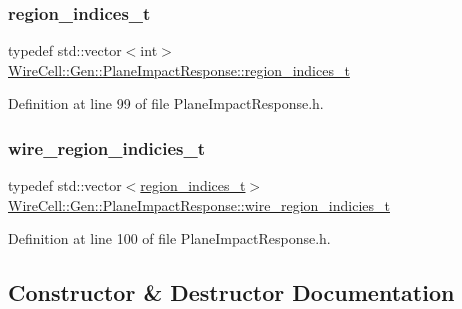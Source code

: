 \subsubsection{\texorpdfstring{region\+\_\+indices\+\_\+t}{region\_indices\_t}}
{\footnotesize\ttfamily typedef std\+::vector$<$int$>$ \hyperlink{class_wire_cell_1_1_gen_1_1_plane_impact_response_a76147eaef10e6fe542bf25d85acc40f7}{Wire\+Cell\+::\+Gen\+::\+Plane\+Impact\+Response\+::region\+\_\+indices\+\_\+t}}



Definition at line 99 of file Plane\+Impact\+Response.\+h.

\mbox{\label{class_wire_cell_1_1_gen_1_1_plane_impact_response_a383b0ed60a99682b46afeb5ecb446078}} 
\subsubsection{\texorpdfstring{wire\+\_\+region\+\_\+indicies\+\_\+t}{wire\_region\_indicies\_t}}
{\footnotesize\ttfamily typedef std\+::vector$<$\hyperlink{class_wire_cell_1_1_gen_1_1_plane_impact_response_a76147eaef10e6fe542bf25d85acc40f7}{region\+\_\+indices\+\_\+t}$>$ \hyperlink{class_wire_cell_1_1_gen_1_1_plane_impact_response_a383b0ed60a99682b46afeb5ecb446078}{Wire\+Cell\+::\+Gen\+::\+Plane\+Impact\+Response\+::wire\+\_\+region\+\_\+indicies\+\_\+t}}



Definition at line 100 of file Plane\+Impact\+Response.\+h.



\subsection{Constructor \& Destructor Documentation}
\mbox{\label{class_wire_cell_1_1_gen_1_1_plane_impact_response_a47289d4ed5ce503243642044b47907fb}} 
